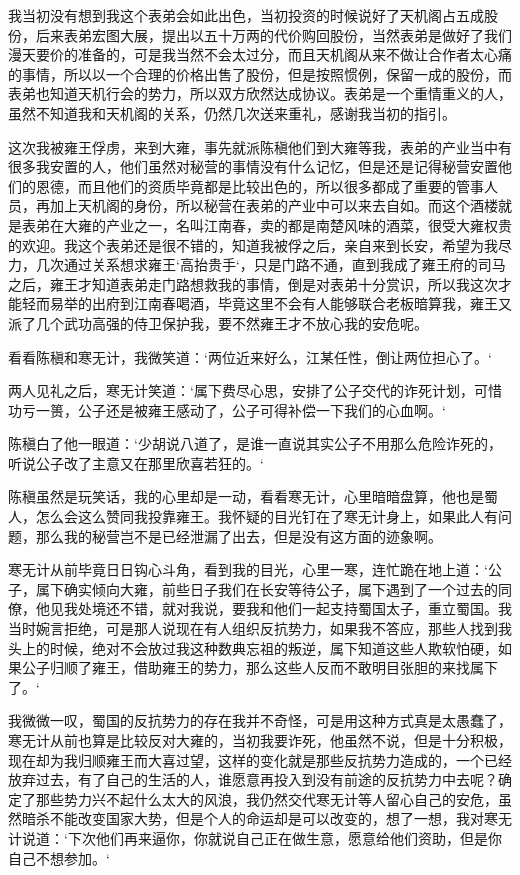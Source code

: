 我当初没有想到我这个表弟会如此出色，当初投资的时候说好了天机阁占五成股份，后来表弟宏图大展，提出以五十万两的代价购回股份，当然表弟是做好了我们漫天要价的准备的，可是我当然不会太过分，而且天机阁从来不做让合作者太心痛的事情，所以以一个合理的价格出售了股份，但是按照惯例，保留一成的股份，而表弟也知道天机行会的势力，所以双方欣然达成协议。表弟是一个重情重义的人，虽然不知道我和天机阁的关系，仍然几次送来重礼，感谢我当初的指引。

这次我被雍王俘虏，来到大雍，事先就派陈稹他们到大雍等我，表弟的产业当中有很多我安置的人，他们虽然对秘营的事情没有什么记忆，但是还是记得秘营安置他们的恩德，而且他们的资质毕竟都是比较出色的，所以很多都成了重要的管事人员，再加上天机阁的身份，所以秘营在表弟的产业中可以来去自如。而这个酒楼就是表弟在大雍的产业之一，名叫江南春，卖的都是南楚风味的酒菜，很受大雍权贵的欢迎。我这个表弟还是很不错的，知道我被俘之后，亲自来到长安，希望为我尽力，几次通过关系想求雍王‘高抬贵手‘，只是门路不通，直到我成了雍王府的司马之后，雍王才知道表弟走门路想救我的事情，倒是对表弟十分赏识，所以我这次才能轻而易举的出府到江南春喝酒，毕竟这里不会有人能够联合老板暗算我，雍王又派了几个武功高强的侍卫保护我，要不然雍王才不放心我的安危呢。

看看陈稹和寒无计，我微笑道：‘两位近来好么，江某任性，倒让两位担心了。‘

两人见礼之后，寒无计笑道：‘属下费尽心思，安排了公子交代的诈死计划，可惜功亏一篑，公子还是被雍王感动了，公子可得补偿一下我们的心血啊。‘

陈稹白了他一眼道：‘少胡说八道了，是谁一直说其实公子不用那么危险诈死的，听说公子改了主意又在那里欣喜若狂的。‘

陈稹虽然是玩笑话，我的心里却是一动，看看寒无计，心里暗暗盘算，他也是蜀人，怎么会这么赞同我投靠雍王。我怀疑的目光钉在了寒无计身上，如果此人有问题，那么我的秘营岂不是已经泄漏了出去，但是没有这方面的迹象啊。

寒无计从前毕竟日日钩心斗角，看到我的目光，心里一寒，连忙跪在地上道：‘公子，属下确实倾向大雍，前些日子我们在长安等待公子，属下遇到了一个过去的同僚，他见我处境还不错，就对我说，要我和他们一起支持蜀国太子，重立蜀国。我当时婉言拒绝，可是那人说现在有人组织反抗势力，如果我不答应，那些人找到我头上的时候，绝对不会放过我这种数典忘祖的叛逆，属下知道这些人欺软怕硬，如果公子归顺了雍王，借助雍王的势力，那么这些人反而不敢明目张胆的来找属下了。‘

我微微一叹，蜀国的反抗势力的存在我并不奇怪，可是用这种方式真是太愚蠢了，寒无计从前也算是比较反对大雍的，当初我要诈死，他虽然不说，但是十分积极，现在却为我归顺雍王而大喜过望，这样的变化就是那些反抗势力造成的，一个已经放弃过去，有了自己的生活的人，谁愿意再投入到没有前途的反抗势力中去呢？确定了那些势力兴不起什么太大的风浪，我仍然交代寒无计等人留心自己的安危，虽然暗杀不能改变国家大势，但是个人的命运却是可以改变的，想了一想，我对寒无计说道：‘下次他们再来逼你，你就说自己正在做生意，愿意给他们资助，但是你自己不想参加。‘

